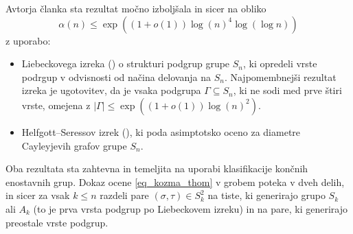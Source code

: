 \documentclass[mat1, tisk]{fmfdelo}
\numberwithin{equation}{section}  %
\begin{document}
Avtorja članka \cite{Kozma_Thom_2016} sta rezultat močno izboljšala in sicer na obliko \begin{equation}\label{eq_kozma_thom}
    \alpha(n)  \le \exp((1 + o(1)) \log(n)^4 \log (\log n))
\end{equation}
z uporabo: 
\begin{itemize}
    \item Liebeckovega izreka (\cite{Liebeck_1984}) o strukturi podgrup grupe $S_n$, ki opredeli vrste podrgup v odvisnosti od načina delovanja na $S_n$. Najpomembnejši rezultat izreka je ugotovitev, da je vsaka podgrupa $\Gamma \subseteq  S_n$, ki ne sodi med prve štiri vrste, omejena z $\lvert \Gamma \rvert \le \exp((1 + o(1)) \log(n)^2)$. 
    \item Helfgott--Seressov izrek (\cite{Helfgott_Seress_2013}), ki poda asimptotsko oceno za diametre Cayleyjevih grafov grupe $S_n$.
\end{itemize} 
Oba rezultata sta zahtevna in temeljita na uporabi klasifikacije končnih enostavnih grup. Dokaz ocene \ref{eq_kozma_thom} v grobem poteka v dveh delih, in sicer za vsak $k \le n$ razdeli pare $(\sigma, \tau) \in S_k^2$ na tiste,
ki generirajo grupo $S_k$ ali $A_k$ (to je prva vrsta podgrup po Liebeckovem izreku) in na pare, ki generirajo preostale vrste podgrup.
\end{document}
